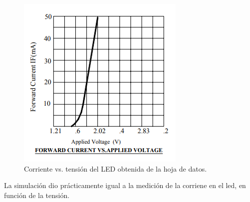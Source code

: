 \begin{figure}[!ht]
\centering
\includegraphics[scale=0.9]{../EJ1/LED/LedDataSheet}
\caption{Corriente vs. tensi\'on del LED obtenida de la hoja de datos.}
\label{med3c}
\end{figure}

La simulaci\'on dio pr\'acticamente igual a la medici\'on de la corriene en el led, en funci\'on de la tensi\'on.







